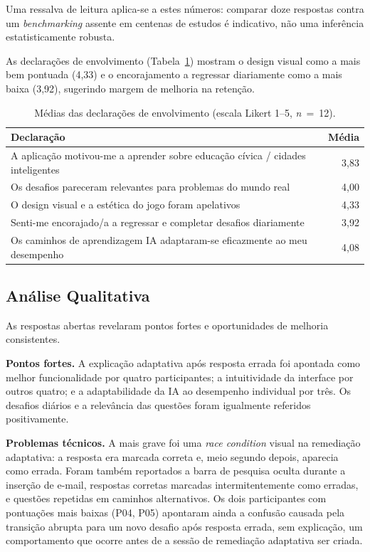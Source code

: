 Uma ressalva de leitura aplica-se a estes números: comparar doze respostas contra um \textit{benchmarking} assente em centenas de estudos é indicativo, não uma inferência estatisticamente robusta.

As declarações de envolvimento (Tabela~\ref{tab:sus-engagement}) mostram o design visual como a mais bem pontuada (4,33) e o encorajamento a regressar diariamente como a mais baixa (3,92), sugerindo margem de melhoria na retenção.

\begin{table}[htb]
\centering
\caption{Médias das declarações de envolvimento (escala Likert 1–5, \textit{n}~=~12).}
\label{tab:sus-engagement}
\begin{tabular}{@{}lr@{}}
\toprule
\textbf{Declaração} & \textbf{Média} \\
\midrule
A aplicação motivou-me a aprender sobre educação cívica / cidades inteligentes & 3,83 \\
Os desafios pareceram relevantes para problemas do mundo real                  & 4,00 \\
O design visual e a estética do jogo foram apelativos                         & 4,33 \\
Senti-me encorajado/a a regressar e completar desafios diariamente            & 3,92 \\
\midrule
Os caminhos de aprendizagem IA adaptaram-se eficazmente ao meu desempenho     & 4,08 \\
\bottomrule
\end{tabular}
\end{table}

\subsection{Análise Qualitativa} \label{sec:usab-qualitativa}

As respostas abertas revelaram pontos fortes e oportunidades de melhoria consistentes.

\textbf{Pontos fortes.} A explicação adaptativa após resposta errada foi apontada como melhor funcionalidade por quatro participantes; a intuitividade da interface por outros quatro; e a adaptabilidade da IA ao desempenho individual por três. Os desafios diários e a relevância das questões foram igualmente referidos positivamente.

\textbf{Problemas técnicos.} A mais grave foi uma \textit{race condition} visual na remediação adaptativa: a resposta era marcada correta e, meio segundo depois, aparecia como errada. Foram também reportados a barra de pesquisa oculta durante a inserção de e-mail, respostas corretas marcadas intermitentemente como erradas, e questões repetidas em caminhos alternativos. Os dois participantes com pontuações mais baixas (P04, P05) apontaram ainda a confusão causada pela transição abrupta para um novo desafio após resposta errada, sem explicação, um comportamento que ocorre antes de a sessão de remediação adaptativa ser criada.

